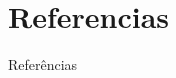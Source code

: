 \section{Referencias}
\begin{frame}{Referências}
    \tiny
    \nocite{fernandes2021}
	\nocite{blalock2020}
	\nocite{nvidea2015}
    \nocite{Quantization1}
    \nocite{Quantization2}
    \nocite{PruneQuantization1}
    \nocite{Quantization4}
	

\end{frame}
